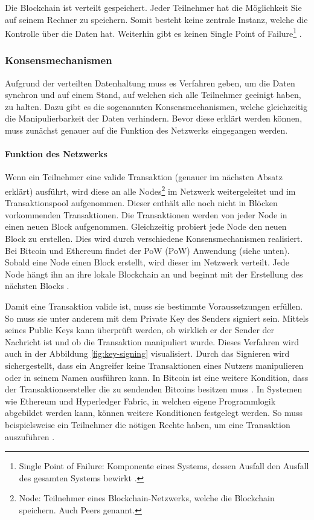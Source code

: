 Die Blockchain ist verteilt gespeichert. Jeder Teilnehmer hat die Möglichkeit Sie auf seinem Rechner zu speichern. Somit besteht keine zentrale Instanz, welche die Kontrolle über die Daten hat. Weiterhin gibt es keinen Single Point of Failure\footnote{Single Point of Failure: Komponente eines Systems, dessen Ausfall den Ausfall des gesamten Systems bewirkt \cite{KshetriCanBlockchainStrengthen2017}.} \cite{KshetriCanBlockchainStrengthen2017}.

\label{subsec:konsens}
\subsubsection{Konsensmechanismen}
Aufgrund der verteilten Datenhaltung muss es Verfahren geben, um die Daten synchron und auf einem Stand, auf welchen sich alle Teilnehmer geeinigt haben, zu halten. Dazu gibt es die sogenannten Konsensmechanismen, welche gleichzeitig die Manipulierbarkeit der Daten verhindern. Bevor diese erklärt werden können, muss zunächst genauer auf die Funktion des Netzwerks eingegangen werden.

\paragraph{Funktion des Netzwerks}
Wenn ein Teilnehmer eine valide Transaktion (genauer im nächsten Absatz erklärt) ausführt, wird diese an alle Nodes\footnote{Node: Teilnehmer eines Blockchain-Netzwerks, welche die Blockchain speichern. Auch Peers genannt.} im Netzwerk weitergeleitet und im Transaktionspool aufgenommen. Dieser enthält alle noch nicht in Blöcken vorkommenden Transaktionen. Die Transaktionen werden von jeder Node in einen neuen Block aufgenommen. Gleichzeitig probiert jede Node den neuen Block zu erstellen. Dies wird durch verschiedene Konsensmechanismen realisiert. Bei Bitcoin und Ethereum findet der \acl{PoW} (\acs{PoW}) Anwendung (siehe unten). Sobald eine Node einen Block erstellt, wird dieser im Netzwerk verteilt. Jede Node hängt ihn an ihre lokale Blockchain an und beginnt mit der Erstellung des nächsten Blocks \cite[S.~200 ff.]{AntonopoulosMasteringbitcoin2015}.

Damit eine Transaktion valide ist, muss sie bestimmte Voraussetzungen erfüllen. So muss sie unter anderem mit dem Private Key des Senders signiert sein. Mittels seines Public Keys kann überprüft werden, ob wirklich er der Sender der Nachricht ist und ob die Transaktion manipuliert wurde. Dieses Verfahren wird auch in der Abbildung \ref{fig:key-signing} visualisiert. Durch das Signieren wird sichergestellt, dass ein Angreifer keine Transaktionen eines Nutzers manipulieren oder in seinem Namen ausführen kann. In Bitcoin ist eine weitere Kondition, dass der Transaktionsersteller die zu sendenden Bitcoins besitzen muss \cite[S.~18]{AntonopoulosMasteringbitcoin2015}. In Systemen wie Ethereum und Hyperledger Fabric, in welchen eigene Programmlogik abgebildet werden kann, können weitere Konditionen festgelegt werden. So muss beispielsweise ein Teilnehmer die nötigen Rechte haben, um eine Transaktion auszuführen \cite{HyperledgerComposerTeamAccessControlLanguage}.

